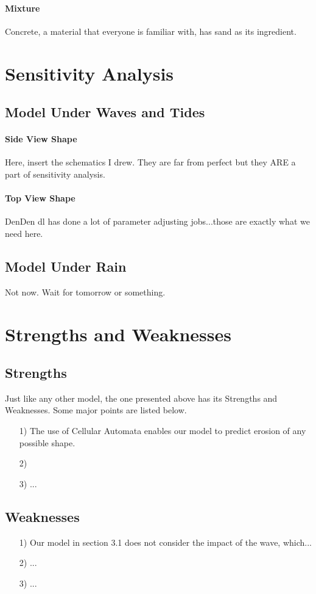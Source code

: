 \documentclass[12pt]{article}
\begin{document}
\paragraph{Mixture}
Concrete, a material that everyone is familiar with, has sand as its ingredient.
\section{Sensitivity Analysis}
\subsection{Model Under Waves and Tides}
\paragraph{Side View Shape}
Here, insert the schematics I drew. They are far from perfect but they ARE a part of sensitivity analysis.
\paragraph{Top View Shape}
DenDen dl has done a lot of parameter adjusting jobs...those are exactly what we need here.
\subsection{Model Under Rain}
Not now. Wait for tomorrow or something.
\section{Strengths and Weaknesses}
\subsection{Strengths}
Just like any other model, the one presented above has its Strengths and Weaknesses. Some major points are listed below.
\begin{itemize}
    \item [1)]
          The use of Cellular Automata enables our model to predict erosion of any possible shape.
    \item [2)]

    \item [3)]
          ...
\end{itemize}
\subsection{Weaknesses}
\begin{itemize}
    \item [1)]
          Our model in section 3.1 does not consider the impact of the wave, which...
    \item [2)]
          ...
    \item [3)]
          ...
\end{itemize}
\end{document}

